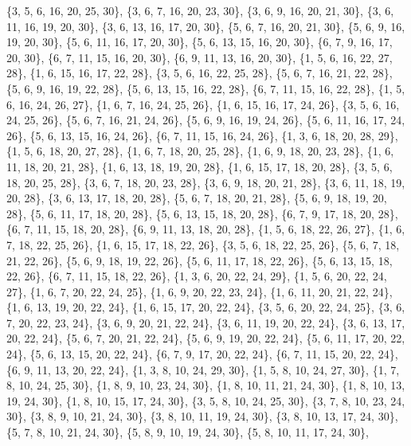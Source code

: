 \documentclass[11pt,a4paper]{article}
\begin{document}
{\{3, 5, 6, 16, 20, 25, 30\}, \{3, 6, 7, 16, 20, 23, 30\}, \{3, 6, 9, 16, 20, 21, 30\}, \{3, 6, 11, 16, 19, 20, 30\}, \{3, 6, 13, 16, 17, 20, 30\},
\{5, 6, 7, 16, 20, 21, 30\}, \{5, 6, 9, 16, 19, 20, 30\}, \{5, 6, 11, 16, 17, 20, 30\}, \{5, 6, 13, 15, 16, 20, 30\}, \{6, 7, 9, 16, 17, 20, 30\},
\{6, 7, 11, 15, 16, 20, 30\}, \{6, 9, 11, 13, 16, 20, 30\}, \{1, 5, 6, 16, 22, 27, 28\}, \{1, 6, 15, 16, 17, 22, 28\}, \{3, 5, 6, 16, 22, 25, 28\},
\{5, 6, 7, 16, 21, 22, 28\}, \{5, 6, 9, 16, 19, 22, 28\}, \{5, 6, 13, 15, 16, 22, 28\}, \{6, 7, 11, 15, 16, 22, 28\}, \{1, 5, 6, 16, 24, 26, 27\},
\{1, 6, 7, 16, 24, 25, 26\}, \{1, 6, 15, 16, 17, 24, 26\}, \{3, 5, 6, 16, 24, 25, 26\}, \{5, 6, 7, 16, 21, 24, 26\}, \{5, 6, 9, 16, 19, 24, 26\},
\{5, 6, 11, 16, 17, 24, 26\}, \{5, 6, 13, 15, 16, 24, 26\}, \{6, 7, 11, 15, 16, 24, 26\}, \{1, 3, 6, 18, 20, 28, 29\}, \{1, 5, 6, 18, 20, 27, 28\},
\{1, 6, 7, 18, 20, 25, 28\}, \{1, 6, 9, 18, 20, 23, 28\}, \{1, 6, 11, 18, 20, 21, 28\}, \{1, 6, 13, 18, 19, 20, 28\}, \{1, 6, 15, 17, 18, 20, 28\},
\{3, 5, 6, 18, 20, 25, 28\}, \{3, 6, 7, 18, 20, 23, 28\}, \{3, 6, 9, 18, 20, 21, 28\}, \{3, 6, 11, 18, 19, 20, 28\}, \{3, 6, 13, 17, 18, 20, 28\},
\{5, 6, 7, 18, 20, 21, 28\}, \{5, 6, 9, 18, 19, 20, 28\}, \{5, 6, 11, 17, 18, 20, 28\}, \{5, 6, 13, 15, 18, 20, 28\}, \{6, 7, 9, 17, 18, 20, 28\},
\{6, 7, 11, 15, 18, 20, 28\}, \{6, 9, 11, 13, 18, 20, 28\}, \{1, 5, 6, 18, 22, 26, 27\}, \{1, 6, 7, 18, 22, 25, 26\}, \{1, 6, 15, 17, 18, 22, 26\},
\{3, 5, 6, 18, 22, 25, 26\}, \{5, 6, 7, 18, 21, 22, 26\}, \{5, 6, 9, 18, 19, 22, 26\}, \{5, 6, 11, 17, 18, 22, 26\}, \{5, 6, 13, 15, 18, 22, 26\},
\{6, 7, 11, 15, 18, 22, 26\}, \{1, 3, 6, 20, 22, 24, 29\}, \{1, 5, 6, 20, 22, 24, 27\}, \{1, 6, 7, 20, 22, 24, 25\}, \{1, 6, 9, 20, 22, 23, 24\},
\{1, 6, 11, 20, 21, 22, 24\}, \{1, 6, 13, 19, 20, 22, 24\}, \{1, 6, 15, 17, 20, 22, 24\}, \{3, 5, 6, 20, 22, 24, 25\}, \{3, 6, 7, 20, 22, 23, 24\},
\{3, 6, 9, 20, 21, 22, 24\}, \{3, 6, 11, 19, 20, 22, 24\}, \{3, 6, 13, 17, 20, 22, 24\}, \{5, 6, 7, 20, 21, 22, 24\}, \{5, 6, 9, 19, 20, 22, 24\},
\{5, 6, 11, 17, 20, 22, 24\}, \{5, 6, 13, 15, 20, 22, 24\}, \{6, 7, 9, 17, 20, 22, 24\}, \{6, 7, 11, 15, 20, 22, 24\}, \{6, 9, 11, 13, 20, 22, 24\},
\{1, 3, 8, 10, 24, 29, 30\}, \{1, 5, 8, 10, 24, 27, 30\}, \{1, 7, 8, 10, 24, 25, 30\}, \{1, 8, 9, 10, 23, 24, 30\}, \{1, 8, 10, 11, 21, 24, 30\},
\{1, 8, 10, 13, 19, 24, 30\}, \{1, 8, 10, 15, 17, 24, 30\}, \{3, 5, 8, 10, 24, 25, 30\}, \{3, 7, 8, 10, 23, 24, 30\}, \{3, 8, 9, 10, 21, 24, 30\},
\{3, 8, 10, 11, 19, 24, 30\}, \{3, 8, 10, 13, 17, 24, 30\}, \{5, 7, 8, 10, 21, 24, 30\}, \{5, 8, 9, 10, 19, 24, 30\}, \{5, 8, 10, 11, 17, 24, 30\},
}
\end{document}
